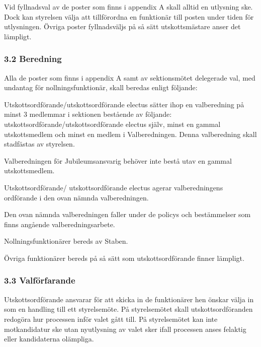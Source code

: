 \documentclass{dsekkallelse}
\begin{document}
Vid fyllnadsval av de poster som finns i appendix A skall alltid en utlysning ske. Dock kan styrelsen välja att tillförordna en funktionär till posten under tiden för utlysningen. Övriga poster fyllnadsväljs på så sätt utskottsmästare anser det lämpligt. 

\subsubsection{3.2 Beredning}

Alla de poster som finns i appendix A samt av sektionsmötet delegerade val, med undantag för nollningsfunktionär, skall beredas enligt följande:

Utskottsordförande/utskottsordförande electus sätter ihop en valberedning på minst 3 medlemmar i sektionen bestående av följande: utskottsordförande/utskottsordförande electus själv, minst en gammal utskottsmedlem och minst en medlem i Valberedningen. Denna valberedning skall stadfästas av styrelsen.

Valberedningen för Jubileumsansvarig behöver inte bestå utav en gammal utskottsmedlem.

Utskottsordförande/ utskottsordförande electus agerar valberedningens ordförande i den ovan nämnda valberedningen. 

Den ovan nämnda valberedningen faller under de policys och bestämmelser som finns angående valberedningsarbete. 

Nollningsfunktionärer bereds av Staben. 

Övriga funktionärer bereds på så sätt som utskottsordförande finner lämpligt. 

\subsubsection{3.3 Valförfarande}
Utskottsordförande ansvarar för att skicka in de funktionärer hen önskar välja in som en handling till ett styrelsemöte. På styrelsemötet skall utskottsordföranden redogöra hur processen inför valet gått till. På styrelsemötet kan inte motkandidatur ske utan nyutlysning av valet sker ifall processen anses felaktig eller kandidaterna olämpliga. 

\pagebreak
\end{document}
